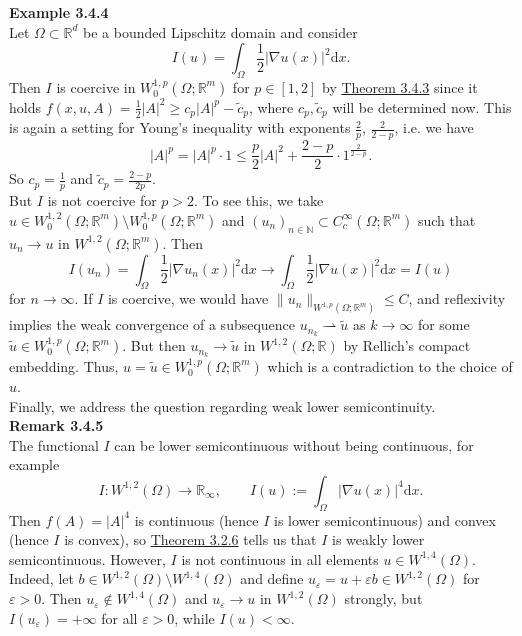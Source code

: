 \textbf{Example 3.4.4}\\
Let $\Omega\subset\mathbb{R}^d$ be a bounded Lipschitz domain and consider
\[I(u)=\int_\Omega{\frac{1}{2}\lvert\nabla u(x)\rvert^2\mathrm{d}x}.\]
Then $I$ is coercive in $W_0^{1,p}(\Omega;\mathbb{R}^m)$ for $p\in[1,2]$ by \hyperlink{theorem_3_4_3}{Theorem 3.4.3} since it holds $f(x,u,A)=\frac{1}{2}\lvert A\rvert^2\geq c_p\lvert A\rvert^p-\tilde{c}_p$, where $c_p,\tilde{c}_p$ will be determined now. This is again a setting for Young's inequality with exponents $\frac{2}{p}$, $\frac{2}{2-p}$, i.e. we have
\[\lvert A\rvert^p=\lvert A\rvert^p\cdot 1\leq\frac{p}{2}\lvert A\rvert^2+\frac{2-p}{2}\cdot 1^{\frac{2}{2-p}}.\]
So $c_p=\frac{1}{p}$ and $\tilde{c}_p=\frac{2-p}{2p}$.\\

But $I$ is not coercive for $p>2$. To see this, we take $u\in W_0^{1,2}(\Omega;\mathbb{R}^m)\setminus W_0^{1,p}(\Omega;\mathbb{R}^m)$ and $(u_n)_{n\in\mathbb{N}}\subset C_c^\infty(\Omega;\mathbb{R}^m)$ such that $u_n\to u$ in $W^{1,2}(\Omega;\mathbb{R}^m)$. Then
\[I(u_n)=\int_\Omega{\frac{1}{2}\lvert\nabla u_n(x)\rvert^2\mathrm{d}x}\to\int_\Omega{\frac{1}{2}\lvert\nabla u(x)\rvert^2\mathrm{d}x}=I(u)\]
for $n\to\infty$. If $I$ is coercive, we would have $\lVert u_n\rVert_{W^{1,p}(\Omega;\mathbb{R}^m)}\leq C$, and reflexivity implies the weak convergence of a subsequence $u_{n_k}\rightharpoonup\tilde{u}$ as $k\to\infty$ for some $\tilde{u}\in W_0^{1,p}(\Omega;\mathbb{R}^m)$. But then $u_{n_k}\to\tilde{u}$ in $W^{1,2}(\Omega;\mathbb{R})$ by Rellich's compact embedding. Thus, $u=\tilde{u}\in W_0^{1,p}(\Omega;\mathbb{R}^m)$ which is a contradiction to the choice of $u$.\\[11pt]

Finally, we address the question regarding weak lower semicontinuity.\\

\textbf{Remark 3.4.5}\\
The functional $I$ can be lower semicontinuous without being continuous, for example
\[I:W^{1,2}(\Omega)\longrightarrow\mathbb{R}_\infty,\qquad I(u):=\int_\Omega{\lvert\nabla u(x)\rvert^4\mathrm{d}x}.\]
Then $f(A)=\lvert A\rvert^4$ is continuous (hence $I$ is lower semicontinuous) and convex (hence $I$ is convex), so \hyperlink{theorem_3_2_6}{Theorem 3.2.6} tells us that $I$ is weakly lower semicontinuous. However, $I$ is not continuous in all elements $u\in W^{1,4}(\Omega)$. Indeed, let $b\in W^{1,2}(\Omega)\setminus W^{1,4}(\Omega)$ and define $u_\varepsilon=u+\varepsilon b\in W^{1,2}(\Omega)$ for $\varepsilon>0$. Then $u_\varepsilon\not\in W^{1,4}(\Omega)$ and $u_\varepsilon\to u$ in $W^{1,2}(\Omega)$ strongly, but $I(u_\varepsilon)=+\infty$ for all $\varepsilon>0$, while $I(u)<\infty$.\\[11pt]

